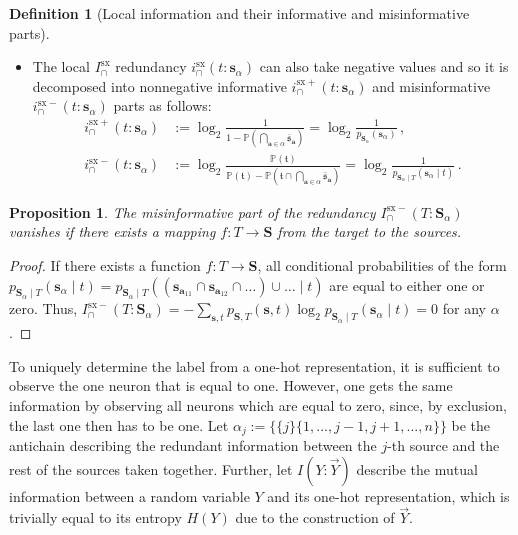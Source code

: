 \documentclass[10pt]{article}
\theoremstyle{definition}
\newtheorem{definition}{Definition}[section]
\theoremstyle{plain}
\newtheorem{proposition}{Proposition}[section]
\begin{document}
\begin{definition}[Local information and their informative and misinformative parts]
\begin{itemize}
        \item The local $I^{\mathrm{sx}}_\cap$ redundancy $i^{\mathrm{sx}}_\cap(t: \bm s_\alpha)$ can also take negative values and so it is decomposed into nonnegative informative $i^{\mathrm{sx}+}_\cap(t: \bm s_\alpha)$ and misinformative $i^{\mathrm{sx}-}_\cap(t: \bm s_\alpha)$ parts as follows:
            \begin{equation*}
                \begin{split}
                    i^{\mathrm{sx}+}_\cap(t: \bm s_\alpha) &:= \log_2\frac{1}{1 - \mathbb{P}\left(\bigcap_{\bm{a}\in \alpha}\bm{\bar{\mathfrak{s}}}_{\bm{a}}\right)} = \log_2\frac{1}{p_{\bm S_\alpha}(\bm s_\alpha)}\,,\\
                    i^{\mathrm{sx}-}_\cap(t: \bm s_\alpha) &:= \log_2\frac{\mathbb{P}\left(\mathfrak{t}\right)}{\mathbb{P}\left(\mathfrak{t}\right) - \mathbb{P}\left(\mathfrak{t} \cap \bigcap_{\bm{a}\in \alpha}\bm{\bar{\mathfrak{s}}}_{\bm{a}}\right)} = \log_2\frac{1}{p_{\bm S_\alpha\mid T}(\bm s_\alpha\mid t)}\,.
                \end{split}
            \end{equation*}
    \end{itemize}
\end{definition}

\begin{proposition}
   \label{lemma:no_mis}
The misinformative part of the redundancy $I_\cap^{\mathrm{sx}-}(T:\bm S_\alpha)$ vanishes if there exists a mapping $f: T \to \bm S$ from the target to the sources.
\end{proposition}
\begin{proof}
If there exists a function $f: T \to \bm S$, all conditional probabilities of the form $p_{\bm S_\alpha\mid T}(\bm s_\alpha\mid t) = p_{\bm S_\alpha\mid T}((\bm s_{\bm a_{11}} \cap \bm s_{\bm a_{12}} \cap \dots) \cup \dots\mid t)$ are equal to 
either one or zero. Thus, $I_\cap^{\mathrm{sx}-}(T:\bm S_\alpha) = - \sum_{\bm s, t} p_{\bm S,T}(\bm s, t) \log_2 p_{\bm S_\alpha\mid T}(\bm s_\alpha\mid t) = 0$ for any $\alpha$.
\end{proof}

To uniquely determine the label from a one-hot representation, it is sufficient to observe the one neuron that is equal to one. However, one gets the same information by observing all neurons which are equal to zero, since, by exclusion, the last one then has to be one. Let $\alpha_j := \{\{j\}\{1, ..., j-1, j+1, ..., n\}\}$ be the antichain describing the redundant information between the $j$-th source and the rest of the sources taken together. Further, let $I(Y: \vec{Y})$ describe the mutual information between a random variable $Y$ and its one-hot representation, which is trivially equal to its entropy $H(Y)$ due to the construction of $\vec{Y}$.
\end{document}
